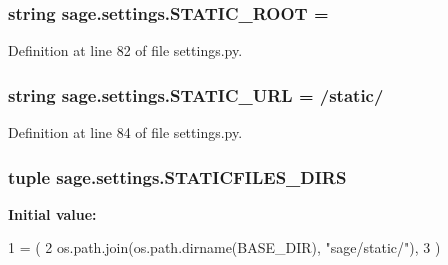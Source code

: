 \hypertarget{a00043_a91b967847aecdd4d0edfbb0229656929}{}
\subsubsection[{S\+T\+A\+T\+I\+C\+\_\+\+R\+O\+O\+T}]{\setlength{\rightskip}{0pt plus 5cm}string sage.\+settings.\+S\+T\+A\+T\+I\+C\+\_\+\+R\+O\+O\+T = \textquotesingle{}\textquotesingle{}}\label{a00043_a91b967847aecdd4d0edfbb0229656929}


Definition at line 82 of file settings.\+py.

\hypertarget{a00043_a0b4647cdde23eaed09c255182a9f576c}{}
\subsubsection[{S\+T\+A\+T\+I\+C\+\_\+\+U\+R\+L}]{\setlength{\rightskip}{0pt plus 5cm}string sage.\+settings.\+S\+T\+A\+T\+I\+C\+\_\+\+U\+R\+L = \textquotesingle{}/static/\textquotesingle{}}\label{a00043_a0b4647cdde23eaed09c255182a9f576c}


Definition at line 84 of file settings.\+py.

\hypertarget{a00043_ac4ae870dea0d58410747ddcbdff2b3d7}{}
\subsubsection[{S\+T\+A\+T\+I\+C\+F\+I\+L\+E\+S\+\_\+\+D\+I\+R\+S}]{\setlength{\rightskip}{0pt plus 5cm}tuple sage.\+settings.\+S\+T\+A\+T\+I\+C\+F\+I\+L\+E\+S\+\_\+\+D\+I\+R\+S}\label{a00043_ac4ae870dea0d58410747ddcbdff2b3d7}
{\bfseries Initial value\+:}
\begin{DoxyCode}
1 = (
2         os.path.join(os.path.dirname(BASE\_DIR), \textcolor{stringliteral}{"sage/static/"}),
3 )
\end{DoxyCode}


